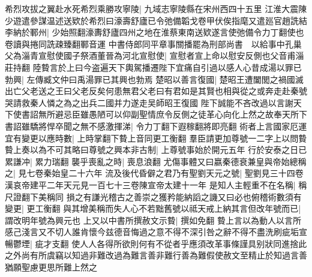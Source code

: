 希烈攻拔之翼赴水死希烈乘勝攻寧陵|{
	九域志寧陵縣在宋州西四十五里}
江淮大震陳少遊遣參謀温述送欵於希烈曰濠壽舒廬已令弛備韜戈卷甲伏俟指麾又遣廵官趙詵結李納於鄆州|{
	少始照翻濠夀舒廬四州之地在淮蔡東南送欵遂言使弛備令力丁翻使也卷讀與捲同詵疎臻翻鄆音運}
中書侍郎同平章事關播罷為刑部尚書　以給事中孔巢父為淄青宣慰使國子祭酒董晉為河北宣慰使|{
	宣慰者宣上命以慰安反側也父音甫淄莊持翻}
陸䞇言於上曰今盗遍天下輿駕播遷陛下宜痛自引過以感人心昔成湯以罪已勃興|{
	左傳臧文仲曰禹湯罪已其興也勃焉}
楚昭以善言復國|{
	楚昭王遭闔閭之禍國滅出亡父老送之王曰父老反矣何患無君父老曰有君如是其賢也相與從之或奔走赴秦號哭請救秦人憐之為之出兵二國并力遂走吴師昭王復國}
陛下誠能不吝改過以言謝天下使書詔無所避忌臣雖愚陋可以仰副聖情庶令反側之徒革心向化上然之故奉天所下書詔雖驕將悍卒聞之無不感激揮涕|{
	令力丁翻下遐稼翻將即亮翻}
術者上言國家厄運宜有變更以應時數|{
	上時掌翻下䞇上音同更工衡翻}
羣臣請更加尊號一二字上以問䞇䞇上奏以為不可其略曰尊號之興本非古制|{
	上尊號事始於開元五年}
行於安泰之日已累謙冲|{
	累力瑞翻}
襲乎喪亂之時|{
	喪息浪翻}
尤傷事體又曰嬴秦德衰兼皇與帝始總稱之|{
	見七卷秦始皇二十六年}
流及後代昏僻之君乃有聖劉天元之號|{
	聖劉見三十四卷漢哀帝建平二年天元見一百七十三卷陳宣帝太建十一年}
是知人主輕重不在名稱|{
	稱尺證翻下美稱同}
損之有謙光稽古之善崇之獲矜能納謟之譏又曰必也俯稽術數須有變更|{
	更工衡翻}
與其增美稱而失人心不若黜舊號以祗天戒上納其言但改年號而已|{
	謂改明年號為興元也}
上又以中書所撰赦文示䞇|{
	撰如免翻}
䞇上言以為動人以言所感己淺言又不切人誰肯懷今兹德音悔過之意不得不深引咎之辭不得不盡洗刷疵垢宣暢鬱堙|{
	疵才支翻}
使人人各得所欲則何有不從者乎應須改革事條謹具别狀同進捨此之外尚有所虞竊以知過非難改過為難言善非難行善為難假使赦文至精止於知過言善猶願聖慮更思所難上然之

